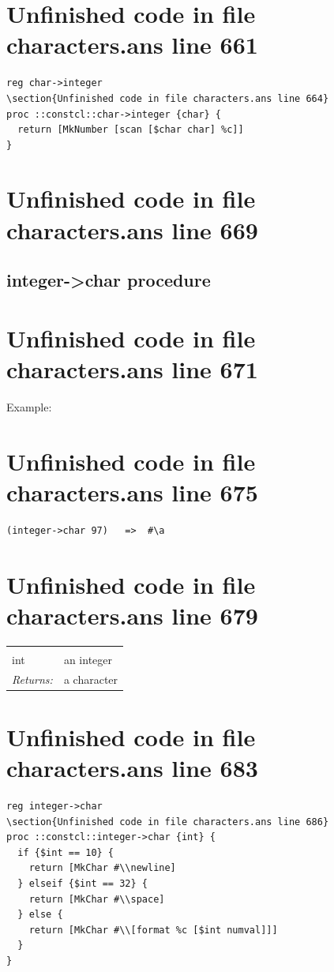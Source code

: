 \documentclass[twoside,9pt]{report}
\begin{document}
\section{Unfinished code in file characters.ans line 661}
\begin{lstlisting}
reg char->integer
\section{Unfinished code in file characters.ans line 664}
proc ::constcl::char->integer {char} {
  return [MkNumber [scan [$char char] %c]]
}
\end{lstlisting}
\section{Unfinished code in file characters.ans line 669}
\subsection{integer->char procedure}
\label{integer->char-procedure}
\section{Unfinished code in file characters.ans line 671}


Example:

\section{Unfinished code in file characters.ans line 675}
\begin{verbatim}
(integer->char 97)   =>  #\a
\end{verbatim}
\section{Unfinished code in file characters.ans line 679}
\noindent\begin{tabular}{ |p{1.9cm} p{8cm}| }
\hline
\rowcolor[HTML]{CCCCCC} \multicolumn{2}{|l|}{\bf integer->char (public)} \\
int & an integer \\
\textit{Returns:} & a character \\
\hline
\end{tabular}
\section{Unfinished code in file characters.ans line 683}
\begin{lstlisting}
reg integer->char
\section{Unfinished code in file characters.ans line 686}
proc ::constcl::integer->char {int} {
  if {$int == 10} {
    return [MkChar #\\newline]
  } elseif {$int == 32} {
    return [MkChar #\\space]
  } else {
    return [MkChar #\\[format %c [$int numval]]]
  }
}
\end{lstlisting}
\end{document}
